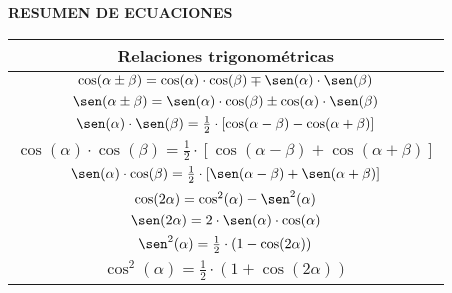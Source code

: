 \documentclass[12pt,es,blanco]{uah}
\begin{document}
\renewcommand{\arraystretch}{1}

\begin{center}

    {\bf RESUMEN DE ECUACIONES}
    
    \vspace{0.5cm}

    \renewcommand{\arraystretch}{1.6}
    \begin{tabular}{|c|}
        \multicolumn{1}{c}{{\bf Relaciones trigonométricas}}\\
        \hline 
        $\cos (\alpha \pm \beta) = \cos (\alpha) \cdot \cos (\beta) \mp \sen (\alpha) \cdot \sen (\beta)$ \\
        \hline 
        $\sen (\alpha \pm \beta) = \sen (\alpha) \cdot \cos (\beta) \pm \cos(\alpha) \cdot \sen (\beta)$ \\
        \hline 
        $\sen (\alpha) \cdot \sen (\beta) = \frac{1}{2} \cdot \left [ \cos (\alpha - \beta ) - \cos (\alpha + \beta ) \right ]$ \\ 
        \hline 
        $\cos (\alpha) \cdot \cos (\beta) = \frac{1}{2} \cdot \left [ \cos (\alpha - \beta ) + \cos (\alpha + \beta ) \right ]$ \\
        \hline 
        $\sen (\alpha) \cdot \cos (\beta) = \frac{1}{2} \cdot \left [ \sen (\alpha - \beta ) + \sen (\alpha + \beta ) \right ]$ \\ 
        \hline 
        $\cos (2 \alpha) = \cos^2 (\alpha) - \sen^2 (\alpha)$ \\ 
        \hline 
        $\sen (2 \alpha) = 2 \cdot \sen (\alpha) \cdot \cos (\alpha)$ \\
        \hline 
        $\sen^2 (\alpha) = \frac{1}{2} \cdot \left ( 1 - \cos (2 \alpha) \right )$ \\
        \hline 
        $\cos^2 (\alpha) = \frac{1}{2} \cdot \left ( 1 + \cos (2 \alpha) \right )$ \\
        \hline
    \end{tabular}
    \renewcommand{\arraystretch}{1}
    \vspace{0.5cm}


\end{center}
\end{document}
